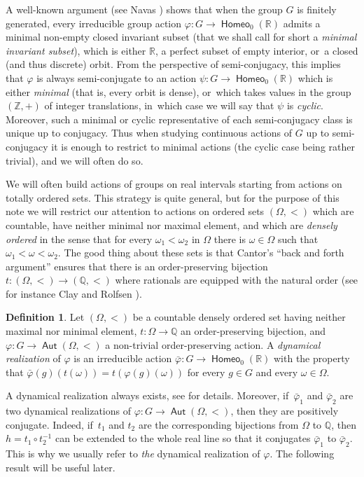 \documentclass[10pt]{amsart}
\theoremstyle{definition}
\newtheorem{dfn}[thm]{Definition}
\DeclareMathOperator{\Aut}{\mathsf{Aut}}
\DeclareMathOperator{\homeo}{\mathsf{Homeo}}
\newcommand{\R}{\mathbb{R}}
\newcommand{\Q}{\mathbb Q}
\newcommand{\Z}{\mathbb Z}
\begin{document}
A well-known argument (see Navas \cite[Prop.\,2.1.12]{Navas-book}) shows that when the group $G$ is finitely generated, every irreducible group action $\varphi\colon G\to \homeo_0(\R)$ admits a minimal non-empty closed invariant subset (that we shall call for short a \emph{minimal invariant subset}), which is either $\R$, a perfect subset of empty interior, or~a closed (and thus discrete) orbit. From the perspective of semi-conjugacy, this implies that $\varphi$ is always semi-conjugate to an action $\psi\colon G\to \homeo_0(\R)$ which is either \emph{minimal} (that is, every orbit is dense), or~which takes values in the group~$(\Z, +)$ of integer translations, in~which case we will say that $\psi$ is \emph{cyclic}. Moreover, such a minimal or cyclic representative of each semi-conjugacy class is unique up to conjugacy. Thus when studying continuous actions of $G$ up to semi-conjugacy it is enough to restrict to minimal actions (the cyclic case being rather trivial), and we will often do so.

We will often build actions of groups on real intervals starting from actions on totally ordered sets. This strategy is quite general, but for the purpose of this note we will restrict our attention to actions on ordered sets $(\Omega,<)$ which are countable, have neither minimal nor maximal element, and which are \emph{densely ordered} in the sense that for every $\omega_1<\omega_2$ in $\Omega$ there is $\omega\in \Omega$ such that $\omega_1<\omega<\omega_2$. The good thing about these sets is that Cantor's ``back and forth argument'' ensures that there is an order-preserving bijection $t\colon (\Omega,<)\to (\Q,<)$ where rationals are equipped with the natural order (see for instance Clay and Rolfsen \cite[Th.\,2.22]{ClayRolfsen}).

\begin{dfn} \label{def dynamical realization}
Let $(\Omega,<)$ be a countable densely ordered set having neither maximal nor minimal element, $t\colon \Omega\to \Q$ an order-preserving bijection, and $\varphi\colon G\to \Aut(\Omega,<)$ a non-trivial order-preserving action. A \emph{dynamical realization} of $\varphi$ is an irreducible action $\bar\varphi\colon G\to \homeo_0(\R)$ with the property that
$\bar\varphi(g)(t(\omega))= t(\varphi(g)(\omega))$
for every $g\in G$ and every $\omega\in \Omega$.
\end{dfn}
A dynamical realization always exists, see \cite[\S 2.4]{ClayRolfsen} for details. Moreover, if~$\bar\varphi_1$ and $\bar\varphi_2$ are two dynamical realizations of $\varphi\colon G\to \Aut(\Omega,<)$, then they are positively conjugate. Indeed, if~$t_1$ and $t_2$ are the corresponding bijections from $\Omega$ to $\Q$, then $h=t_1\circ t_2^{-1}$ can be extended to the whole real line so that it conjugates $\bar\varphi_1$ to $\bar\varphi_2$. This is why we usually refer to \emph{the} dynamical realization of $\varphi$. The following result will be useful later.
\end{document}
